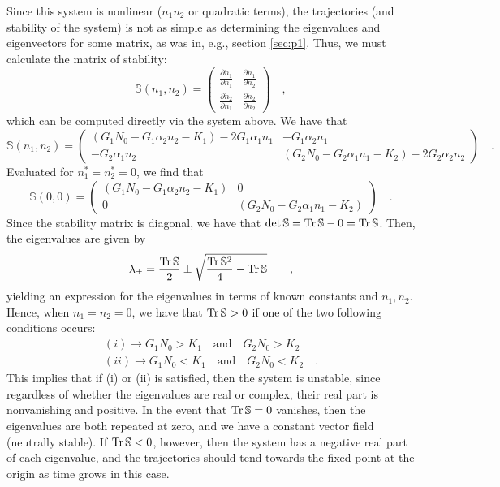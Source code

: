 \documentclass[draft]{agujournal2019}
\begin{document}
Since this system is nonlinear ($n_1 n_2$ or quadratic terms), the trajectories (and stability of the system) is not as simple as determining the eigenvalues and eigenvectors for some matrix, as was in, e.g., section \ref{sec:p1}. Thus, we must calculate the matrix of stability:
\begin{equation*}
    \mathbb S(n_1,n_2) = \begin{pmatrix}
        \frac{\partial\dot n_1}{\partial n_1} & \frac{\partial\dot n_1}{\partial n_2} \\
        \frac{\partial\dot n_2}{\partial n_1} & \frac{\partial\dot n_2}{\partial n_2}
    \end{pmatrix} \quad ,    
\end{equation*}
which can be computed directly via the system above. We have that
\begin{equation*}
    \mathbb S(n_1,n_2) = \begin{pmatrix}
        (G_1 N_0 - G_1 \alpha_2 n_2 - K_1) - 2 G_1 \alpha_1 n_1 & -G_1 \alpha_2 n_1 \\
        - G_2 \alpha_1 n_2 & (G_2N_0 - G_2 \alpha_1 n_1 - K_2) - 2G_2\alpha_2 n_2
    \end{pmatrix} \quad .    
\end{equation*}
Evaluated for $n_1^*=n_2^*=0$, we find that 
\begin{equation*}
    \mathbb S(0,0) = \begin{pmatrix}
        (G_1 N_0 - G_1 \alpha_2 n_2 - K_1) & 0 \\
        0& (G_2N_0 - G_2 \alpha_1 n_1 - K_2)
    \end{pmatrix} \quad .    
\end{equation*}
Since the stability matrix is diagonal, we have that $\mathrm{det}\,\mathbb{S} = \mathrm{Tr}\,\mathbb{S} - 0 = \mathrm{Tr}\,\mathbb{S}$. Then, the eigenvalues are given by 
\begin{equation*}
    \lambda_\pm = \frac{\mathrm{Tr}\,\mathbb{S}}{2} \pm \sqrt{\frac{\mathrm{Tr}\,\mathbb{S}^2}{4} - \mathrm{Tr}\,\mathbb{S}} \qquad ,
\end{equation*}
yielding an expression for the eigenvalues in terms of known constants and $n_1,n_2$. Hence, when $n_1=n_2=0$, we have that $\mathrm{Tr}\,\mathbb{S}>0$ if one of the two following conditions occurs:
\begin{align*}
    (i)\longrightarrow G_1 N_0 > K_1 \quad \mathrm{and} \quad G_2 N_0 > K_2 \\
    (ii)\longrightarrow G_1 N_0 < K_1 \quad \mathrm{and} \quad G_2 N_0 < K_2 \quad .
\end{align*}
This implies that if (i) or (ii) is satisfied, then the system is unstable, since regardless of whether the eigenvalues are real or complex, their real part is nonvanishing and positive. In the event that $\mathrm{Tr}\,\mathbb{S}=0$ vanishes, then the eigenvalues are both repeated at zero, and we have a constant vector field (neutrally stable). If $\mathrm{Tr}\,\mathbb{S}<0$, however, then the system has a negative real part of each eigenvalue, and the trajectories should tend towards the fixed point at the origin as time grows in this case. 
\end{document}
